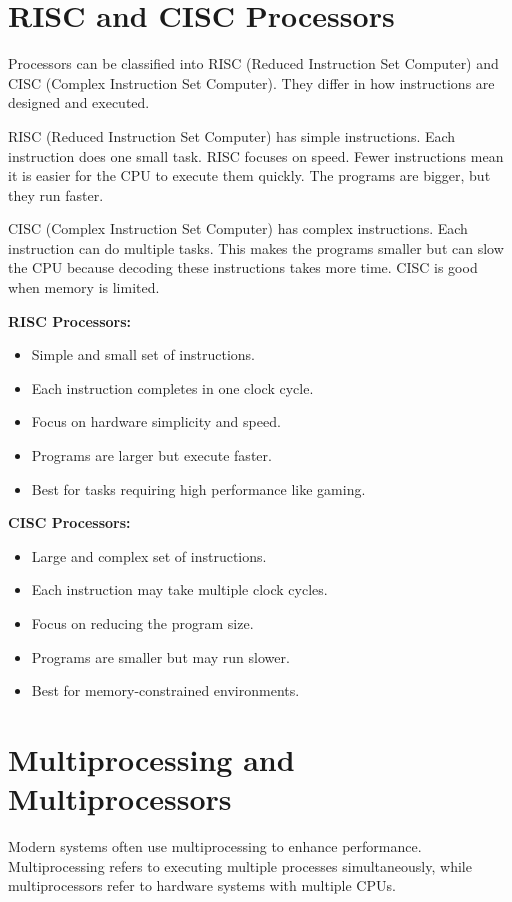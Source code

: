 \documentclass[12pt]{article}
\begin{document}
\section*{RISC and CISC Processors}
Processors can be classified into RISC (Reduced Instruction Set Computer) and CISC (Complex Instruction Set Computer). They differ in how instructions are designed and executed.

RISC (Reduced Instruction Set Computer) has simple instructions. Each instruction does one small task. RISC focuses on speed. Fewer instructions mean it is easier for the CPU to execute them quickly. The programs are bigger, but they run faster.

CISC (Complex Instruction Set Computer) has complex instructions. Each instruction can do multiple tasks. This makes the programs smaller but can slow the CPU because decoding these instructions takes more time. CISC is good when memory is limited.

\begin{multicols}{2}
    \textbf{RISC Processors:}
    \begin{itemize}
        \item Simple and small set of instructions.
        \item Each instruction completes in one clock cycle.
        \item Focus on hardware simplicity and speed.
        \item Programs are larger but execute faster.
        \item Best for tasks requiring high performance like gaming.
    \end{itemize}
    
    \columnbreak
    
    \textbf{CISC Processors:}
    \begin{itemize}
        \item Large and complex set of instructions.
        \item Each instruction may take multiple clock cycles.
        \item Focus on reducing the program size.
        \item Programs are smaller but may run slower.
        \item Best for memory-constrained environments.
    \end{itemize}
\end{multicols}

\newpage
\section*{Multiprocessing and Multiprocessors}
Modern systems often use multiprocessing to enhance performance. Multiprocessing refers to executing multiple processes simultaneously, while multiprocessors refer to hardware systems with multiple CPUs.
\end{document}
